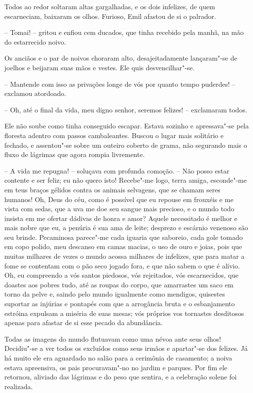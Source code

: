 Todos ao redor soltaram altas gargalhadas, e os dois infelizes, de quem
escarneciam, baixaram os olhos. Furioso, Emil afastou de si o palrador.

-- Tomai! -- gritou e enfiou cem ducados, que tinha recebido pela
manhã, na mão do estarrecido noivo.

Os anciãos e o par de noivos choraram alto, desajeitadamente lançaram"-se
de joelhos e beijaram suas mãos e vestes. Ele quis desvencilhar"-se.

-- Mantende com isso as privações longe de vós por quanto tempo
puderdes! -- exclamou atordoado.

-- Oh, até o final da vida, meu digno senhor, seremos felizes! --
exclamaram todos.

Ele não soube como tinha conseguido escapar. Estava sozinho e
apressava"-se pela floresta adentro com passos cambaleantes. Buscou o
lugar mais solitário e fechado, e assentou"-se sobre um outeiro coberto
de grama, não segurando mais o fluxo de lágrimas que agora rompia
livremente.

-- A vida me repugna! -- soluçava com profunda comoção. -- Não posso
estar contente e ser feliz; eu não quero isto! Recebe"-me logo, terra
amiga, esconde"-me em teus braços gélidos contra os animais selvagens,
que se chamam seres humanos! Oh, Deus do céu, como é possível que eu
repouse em frouxéis e me vista com sedas, que a uva me doe seu sangue
mais precioso, e o mundo todo insista em me ofertar dádivas de honra e
amor? Aquele necessitado é melhor e mais nobre que eu, a penúria é
sua ama de leite; desprezo e escárnio venenoso são seu brinde.
Pecaminosa parece"-me cada iguaria que saboreio, cada gole tomado em
copo polido, meu descanso em camas macias, o uso de ouro e joias, pois
que muitas milhares de vezes o mundo acossa milhares de infelizes, que
para matar a fome se contentam com o pão seco jogado fora, e que não
sabem o que é alívio. Oh, eu compreendo a vós santos piedosos, vós
rejeitados, vós escarnecidos, que doastes aos pobres tudo, até as
roupas do corpo, que amarrastes um saco em torno da pelve e, saindo
pelo mundo igualmente como mendigos, quisestes suportar as injúrias e
pontapés com que a arrogância bruta e o esbanjamento estróina expulsam
a miséria de suas mesas; vós próprios vos tornastes desditosos apenas
para afastar de si esse pecado da abundância.

Todas as imagens do mundo flutuavam como uma névoa ante seus olhos!
Decidiu"-se a ver todos os excluídos como seus irmãos e apartar"-se dos
felizes. Já há muito ele era aguardado no salão para a cerimônia de
casamento; a noiva estava apreensiva, os pais procuravam"-no no jardim e
parques. Por fim ele retornou, aliviado das lágrimas e do peso que
sentira, e a celebração solene foi realizada.

